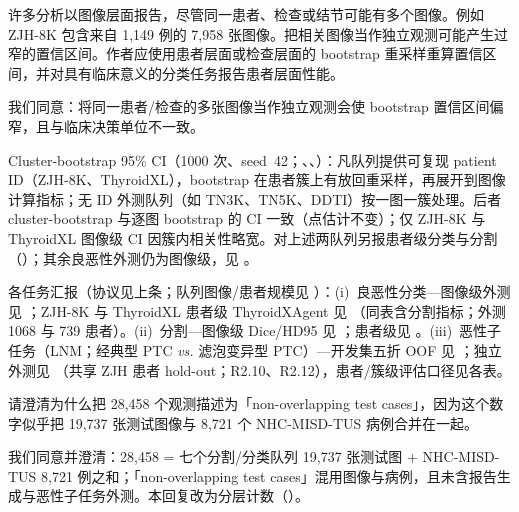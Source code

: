 \begin{reviewercomment}
许多分析以图像层面报告，尽管同一患者、检查或结节可能有多个图像。例如 ZJH-8K 包含来自 1,149 例的 7,958 张图像。把相关图像当作独立观测可能产生过窄的置信区间。作者应使用患者层面或检查层面的 bootstrap 重采样重算置信区间，并对具有临床意义的分类任务报告患者层面性能。
\end{reviewercomment}
\begin{authorresponse}
我们同意：将同一患者/检查的多张图像当作独立观测会使 bootstrap 置信区间偏窄，且与临床决策单位不一致。\par
Cluster-bootstrap 95\% CI（1000 次、seed~42；、、）：凡队列提供可复现 patient ID（ZJH-8K、ThyroidXL），bootstrap 在患者簇上有放回重采样，再展开到图像计算指标；无 ID 外测队列（如 TN3K、TN5K、DDTI）按一图一簇处理。后者 cluster-bootstrap 与逐图 bootstrap 的 CI 一致（点估计不变）；仅 ZJH-8K 与 ThyroidXL 图像级 CI 因簇内相关性略宽。对上述两队列另报患者级分类与分割（）；其余良恶性外测仍为图像级，见 。\par
各任务汇报（协议见上条；队列图像/患者规模见 ）：(i)~良恶性分类---图像级外测见 ；ZJH-8K 与 ThyroidXL 患者级 ThyroidXAgent 见 （同表含分割指标；外测 1068 与 739 患者）。(ii)~分割---图像级 Dice/HD95 见 ；患者级见 。(iii)~恶性子任务（LNM；经典型 PTC \emph{vs.} 滤泡变异型 PTC）---开发集五折 OOF 见 ；独立外测见 （共享 ZJH 患者 hold-out；R2.10、R2.12），患者/簇级评估口径见各表。\par
\noindent\par
\par
\end{authorresponse}

\begin{reviewercomment}
请澄清为什么把 28,458 个观测描述为「non-overlapping test cases」，因为这个数字似乎把 19,737 张测试图像与 8,721 个 NHC-MISD-TUS 病例合并在一起。
\end{reviewercomment}
\begin{authorresponse}
我们同意并澄清：28,458 = 七个分割/分类队列 19,737 张测试图 + NHC-MISD-TUS 8,721 例之和；「non-overlapping test cases」混用图像与病例，且未含报告生成与恶性子任务外测。本回复改为分层计数（）。\par
\par
\end{authorresponse}

